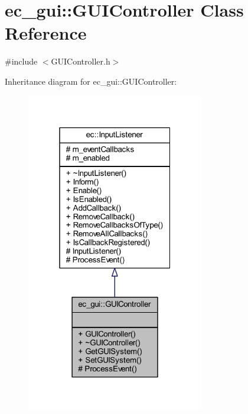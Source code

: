 \hypertarget{classec__gui_1_1_g_u_i_controller}{}\section{ec\+\_\+gui\+:\+:G\+U\+I\+Controller Class Reference}
\label{classec__gui_1_1_g_u_i_controller}


{\ttfamily \#include $<$G\+U\+I\+Controller.\+h$>$}



Inheritance diagram for ec\+\_\+gui\+:\+:G\+U\+I\+Controller\+:\nopagebreak
\begin{figure}[H]
\begin{center}
\leavevmode
\includegraphics[width=220pt]{classec__gui_1_1_g_u_i_controller__inherit__graph}
\end{center}
\end{figure}


